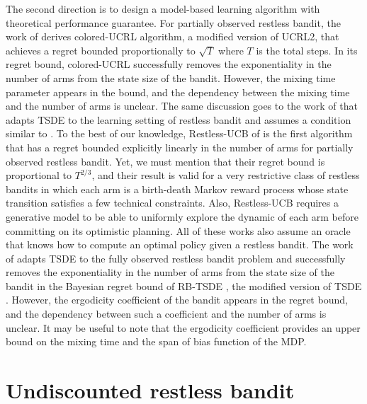 The second direction is to design a model-based learning algorithm with theoretical performance guarantee.
For partially observed restless bandit, the work of \cite{ortner2012regret} derives colored-UCRL algorithm, a modified version of UCRL2, that achieves a regret bounded proportionally to $\sqrt{T}$ where $T$ is the total steps.
In its regret bound, colored-UCRL successfully removes the exponentiality in the number of arms from the state size of the bandit.
However, the mixing time parameter appears in the bound, and the dependency between the mixing time and the number of arms is unclear.
The same discussion goes to the work of \cite{jung2019thompson} that adapts TSDE \cite{ouyang2017learning} to the learning setting of restless bandit and assumes a condition similar to \cite{ortner2012regret}.
To the best of our knowledge, Restless-UCB of \cite{wang2020restless} is the first algorithm that has a regret bounded explicitly linearly in the number of arms for partially observed restless bandit.
Yet, we must mention that their regret bound is proportional to $T^{2/3}$, and their result is valid for a very restrictive class of restless bandits in which each arm is a birth-death Markov reward process whose state transition satisfies a few technical constraints.
Also, Restless-UCB requires a generative model to be able to uniformly explore the dynamic of each arm before committing on its optimistic planning.
All of these works also assume an oracle that knows how to compute an optimal policy given a restless bandit.
The work of \cite{akbarzadeh2022learning} adapts TSDE \cite{ouyang2017learning} to the fully observed restless bandit problem and successfully removes the exponentiality in the number of arms from the state size of the bandit in the Bayesian regret bound of RB-TSDE \cite{akbarzadeh2022learning}, the modified version of TSDE \cite{ouyang2017learning}.
However, the ergodicity coefficient of the bandit appears in the regret bound, and the dependency between such a coefficient and the number of arms is unclear.
It may be useful to note that the ergodicity coefficient provides an upper bound on the mixing time and the span of bias function of the MDP.


\section{Undiscounted restless bandit}
\label{ch:restless:sec:restless}

